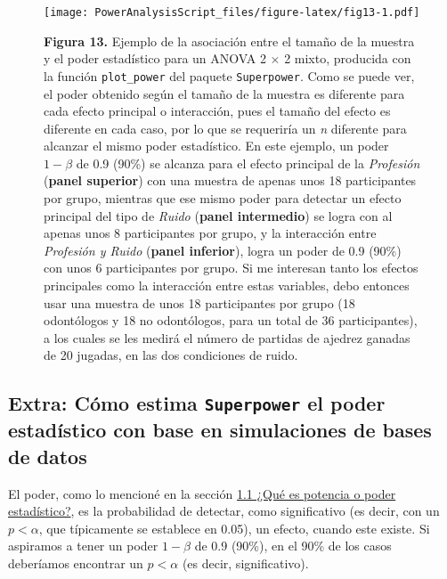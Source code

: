\documentclass[
]{article}
\begin{document}
\begin{figure}
\centering
\texttt{[image: PowerAnalysisScript\_files/figure-latex/fig13-1.pdf]}
\caption{\textbf{Figura 13.} Ejemplo de la asociación entre el tamaño de
la muestra y el poder estadístico para un ANOVA 2 \(\times\) 2 mixto,
producida con la función \texttt{plot\_power} del paquete
\texttt{Superpower}. Como se puede ver, el poder obtenido según el
tamaño de la muestra es diferente para cada efecto principal o
interacción, pues el tamaño del efecto es diferente en cada caso, por lo
que se requeriría un \emph{n} diferente para alcanzar el mismo poder
estadístico. En este ejemplo, un poder \(1-\beta\) de 0.9 (90\%) se
alcanza para el efecto principal de la \emph{Profesión} (\textbf{panel
superior}) con una muestra de apenas unos 18 participantes por grupo,
mientras que ese mismo poder para detectar un efecto principal del tipo
de \emph{Ruido} (\textbf{panel intermedio}) se logra con al apenas unos
8 participantes por grupo, y la interacción entre \emph{Profesión y
Ruido} (\textbf{panel inferior}), logra un poder de 0.9 (90\%) con unos
6 participantes por grupo. Si me interesan tanto los efectos principales
como la interacción entre estas variables, debo entonces usar una
muestra de unos 18 participantes por grupo (18 odontólogos y 18 no
odontólogos, para un total de 36 participantes), a los cuales se les
medirá el número de partidas de ajedrez ganadas de 20 jugadas, en las
dos condiciones de ruido.}
\end{figure}

\hypertarget{extra-cuxf3mo-estima-superpower-el-poder-estaduxedstico-con-base-en-simulaciones-de-bases-de-datos}{%
\subsection{\texorpdfstring{Extra: Cómo estima \texttt{Superpower} el
poder estadístico con base en simulaciones de bases de
datos}{Extra: Cómo estima Superpower el poder estadístico con base en simulaciones de bases de datos}}\label{extra-cuxf3mo-estima-superpower-el-poder-estaduxedstico-con-base-en-simulaciones-de-bases-de-datos}}

El poder, como lo mencioné en la sección \protect\hyperlink{power}{1.1
¿Qué es potencia o poder estadístico?}, es la probabilidad de detectar,
como significativo (es decir, con un \(p < \alpha\), que típicamente se
establece en 0.05), un efecto, cuando este existe. Si aspiramos a tener
un poder \(1-\beta\) de 0.9 (90\%), en el 90\% de los casos deberíamos
encontrar un \(p < \alpha\) (es decir, significativo).
\end{document}
